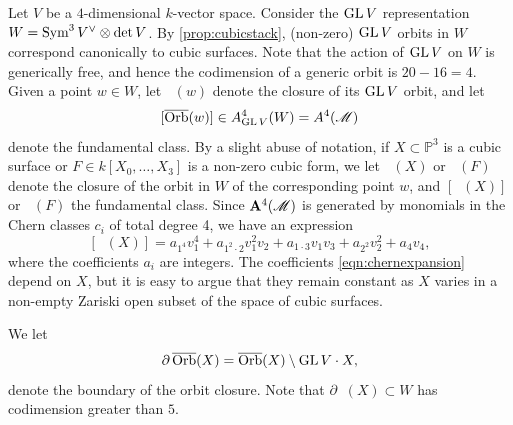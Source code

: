 \documentclass[12pt,reqno]{amsart}
\renewcommand{\k}{k}
\DeclareMathOperator{\Orb}{\overline{Orb}}
\numberwithin{equation}{section}
\begin{document}
Let $V$ be a $4$-dimensional $\k$-vector space.
Consider the $\operatorname{GL} V$ representation $W = \operatorname{Sym}^3 V^\vee \otimes \det V$.
By \autoref{prop:cubicstack}, (non-zero) $\operatorname{GL} V$ orbits in $W$ correspond canonically to cubic surfaces.
Note that the action of $\operatorname{GL} V$ on $W$ is generically free, and hence the codimension of a generic orbit is $20-16 = 4$.
Given a point $w \in W$, let $\Orb(w)$ denote the closure of its $\operatorname{GL} V$ orbit, and let
\[ [\Orb(w)] \in A^4_{\GL V}(W) = A^4(\mathscr M)\]
denote the fundamental class.
By a slight abuse of notation, if $X \subset \mathbb P^3$ is a cubic surface or $F \in k[X_0, \dots, X_3]$ is a non-zero cubic form, we let $\Orb(X)$ or $\Orb(F)$ denote the closure of the orbit in $W$ of the corresponding point $w$, and $[\Orb(X)]$ or $\Orb(F)$ the fundamental class.
Since ${\bf A}^4(\mathscr M)$ is generated by monomials in the Chern classes $c_i$ of total degree 4, we have an expression
\begin{equation}\label{eqn:chernexpansion}
  [\Orb(X)] = a_{1^4}v_1^4 + a_{1^2\cdot 2} v_1^2v_2 + a_{1\cdot 3} v_1v_3 + a_{2^2}v_2^2 + a_4 v_4,
\end{equation}
where the coefficients $a_i$ are integers.
The coefficients \eqref{eqn:chernexpansion} depend on $X$, but it is easy to argue that they remain constant as $X$ varies in a non-empty Zariski open subset of the space of cubic surfaces.

We let
\[ \partial \Orb(X) = \Orb(X) \setminus \GL V \cdot X,\]
denote the boundary of the orbit closure.
Note that $\partial \Orb(X) \subset W$ has codimension greater than $5$.
\end{document}

